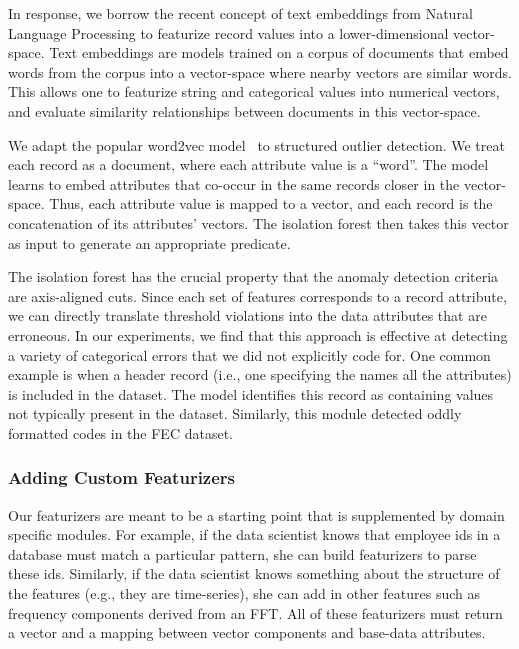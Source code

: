 In response, we borrow the recent concept of text embeddings from Natural Language Processing to featurize record values into a lower-dimensional vector-space.  
Text embeddings are models trained on a corpus of documents that embed words from the corpus into a vector-space where nearby vectors are similar words.
This allows one to featurize string and categorical values into numerical vectors, and evaluate similarity relationships between documents in this vector-space.

We adapt the popular \textsf{word2vec} model~\cite{mikolov2013distributed} to structured outlier detection. 
We treat each record as a document, where each attribute value is a ``word''. 
The model learns to embed attributes that co-occur in the same records closer in the vector-space.
Thus, each attribute value is mapped to a vector, and each record is the concatenation of its attributes' vectors.  
The isolation forest then takes this vector as input to generate an appropriate predicate.  

The isolation forest has the crucial property that the anomaly detection criteria are axis-aligned cuts.  Since each set of features corresponds to a record attribute, we can directly translate threshold violations into the data attributes that are erroneous.
In our experiments, we find that this approach is effective at detecting a variety of categorical errors that we did not explicitly code for.
One common example is when a header record (i.e., one specifying the names all the attributes) is included in the dataset.
The model identifies this record as containing values not typically present in the dataset.
Similarly, this module detected oddly formatted codes in the FEC dataset.

\subsubsection{Adding Custom Featurizers} 
Our featurizers are meant to be a starting point that is supplemented by domain specific modules. For example, if the data scientist knows that employee ids in a database must match a particular pattern, she can build featurizers to parse these ids. Similarly, if the data scientist knows something about the structure of the features (e.g., they are time-series), she can add in other features such as frequency components derived from an FFT. All of these featurizers must return a vector and a mapping between vector components and base-data attributes.


\iffalse
